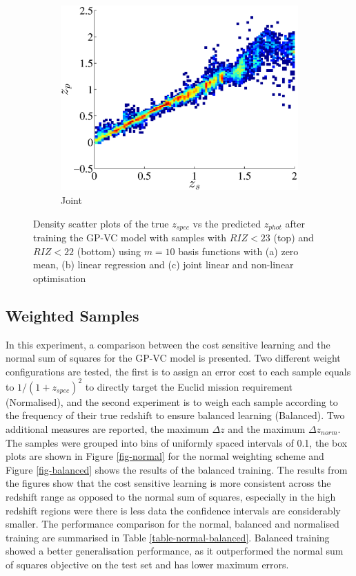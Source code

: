 \documentclass[useAMS,usenatbib,fleqn]{mn2e}
\begin{document}
\begin{figure}
\begin{subfigure}[b]{0.3\textwidth}
                \includegraphics[width=\textwidth]{figures/22_J.eps}
                \caption{Joint}
        \end{subfigure}
        
        \caption{Density scatter plots of the true $z_{spec}$ vs the predicted $z_{phot}$ after training the GP-VC model with samples with $RIZ<23$ (top) and $RIZ<22$ (bottom) using $m=10$ basis functions with (a) zero mean, (b) linear regression and (c) joint linear and non-linear optimisation}
        \label{fig-RIZ-splits}
\end{figure}


\subsection{Weighted Samples}
In this experiment, a comparison between the cost sensitive learning and the normal sum of squares for the GP-VC model is presented. Two different weight configurations are tested, the first is to assign an error cost to each sample equals to $1/\left(1+z_{spec}\right)^{2}$ to directly target the Euclid mission requirement (Normalised), and the second experiment is to weigh each sample according to the frequency of their true redshift to ensure balanced learning (Balanced).  Two additional measures are reported, the maximum $\Delta z$ and the maximum $\Delta z_{norm}$. The samples were grouped into bins of uniformly spaced intervals of 0.1, the box plots are shown in Figure \ref{fig-normal} for the normal weighting scheme and Figure \ref{fig-balanced} shows the results of the balanced training. The results from the figures show that the cost sensitive learning is more consistent across the redshift range as opposed to the normal sum of squares, especially in the high redshift regions were there is less data the confidence intervals are considerably smaller. The performance comparison for the normal, balanced and normalised training are summarised in Table \ref{table-normal-balanced}. Balanced training showed a better generalisation performance, as it outperformed the normal sum of squares objective on the test set and has lower maximum errors.
\end{document}
